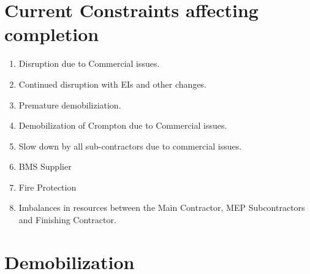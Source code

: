\begin{comment}
Hired manpower      &               &\\
\Z ERE                     &53           &51\\
\Z Exblowra             &34            &39\\
\Z Deotech               &24           &24\\
\Z GVG                    &9             &10\\
\Z Thermo               &7             &13\\
                          & \underline{\phantom{1075}}& \underline{\phantom{1075}}\\
\Z Total hire manpower &127     &137\\
~&&\\
Total                      & \underline{\underline{1039}}       &\underline{\underline{1338}}\\
                             & &\\
\bottomrule
\end{tabular}
\caption{Average Manpower as of January 2011}
\label{tbl:manpower}
\end{center}
\end{table}
\end{comment}



\section*{Current Constraints affecting completion}

\begin{enumerate}
\item Disruption due to Commercial issues.
\item Continued disruption with EIs and other changes.
\item Premature demobiliziation.
\item Demobilization of Crompton due to Commercial issues.
\item Slow down by all sub-contractors due to commercial issues.
\item BMS Supplier
\item Fire Protection
\item Imbalances in resources between the Main Contractor, MEP Subcontractors and Finishing Contractor. 
\end{enumerate}

\section*{Demobilization}

